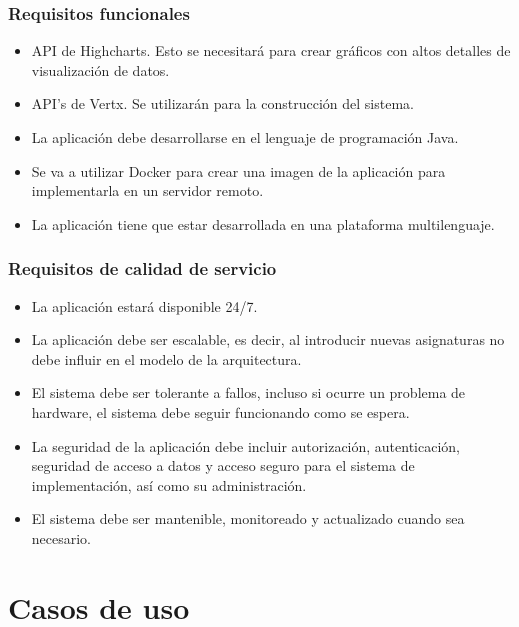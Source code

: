 \subsubsection{Requisitos funcionales}
\begin{itemize}
\item {API de Highcharts. Esto se necesitará para crear gráficos con altos detalles de visualización de datos.}
\item {API’s de Vertx. Se utilizarán para la construcción del sistema. }
\item {La aplicación debe desarrollarse en el lenguaje de programación Java.}
\item {Se va a utilizar Docker para crear una imagen de la aplicación para implementarla en un servidor remoto.}
\item {La aplicación tiene que estar desarrollada en una plataforma multilenguaje.}
\end{itemize}
\subsubsection{Requisitos de calidad de servicio}
\begin{itemize}
\item {La aplicación estará disponible 24/7.}
\item {La aplicación debe ser escalable, es decir, al introducir nuevas asignaturas no debe influir en el modelo de la arquitectura.}
\item {El sistema debe ser tolerante a fallos, incluso si ocurre un problema de hardware, el sistema debe seguir funcionando como se espera.}
\item {La seguridad de la aplicación debe incluir autorización, autenticación, seguridad de acceso a datos y acceso seguro para el sistema de implementación, así como su administración.}
\item {El sistema debe ser mantenible, monitoreado y actualizado cuando sea necesario.}
\end{itemize}
\section{Casos de uso}



